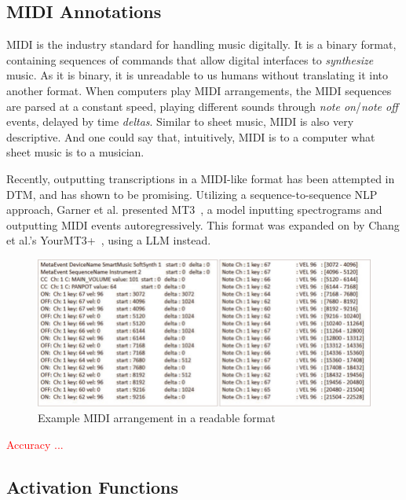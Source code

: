 \subsection{MIDI Annotations}

\gls{MIDI} is the industry standard for handling music digitally. It is a binary format, containing sequences of commands that allow digital interfaces to \textit{synthesize} music. As it is binary, it is unreadable to us humans without translating it into another format. When computers play \gls{MIDI} arrangements, the \gls{MIDI} sequences are parsed at a constant speed, playing different sounds through \textit{note on}/\textit{note off} events, delayed by time \textit{deltas}. Similar to sheet music, \gls{MIDI} is also very descriptive. And one could say that, intuitively, \gls{MIDI} is to a computer what sheet music is to a musician.

Recently, outputting transcriptions in a \gls{MIDI}-like format has been attempted in \gls{DTM}, and has shown to be promising. Utilizing a sequence-to-sequence \gls{NLP} approach, Garner et al. presented MT3~\cite{gardner2022mt3multitaskmultitrackmusic}, a model inputting spectrograms and outputting \gls{MIDI} events autoregressively. This format was expanded on by Chang et al.'s YourMT3+~\cite{chang2024yourmt3multiinstrumentmusictranscription}, using a \gls{LLM} instead.

\begin{figure}[H]
    \centering
    \includegraphics[scale=0.5, trim={0 0 13.8cm 0},clip]{figures/midi}
    \caption{Example MIDI arrangement in a readable format}
    \label{MIDIFigure}
\end{figure}

\textcolor{red}{Accuracy ...}

\subsection{Activation Functions}

